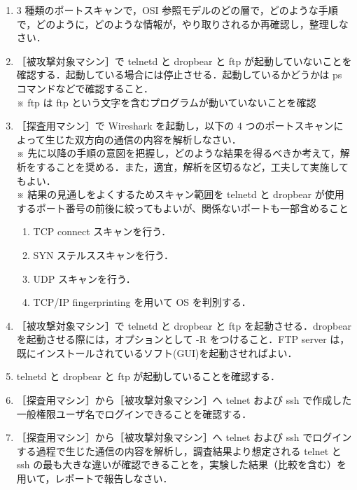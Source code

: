 \documentclass[dvipdfmx,autodetect-engine, 12pt]{jsarticle}
\begin{document}
\begin{enumerate}[label=(\arabic*)]
\begin{enumerate}[label=\arabic*]
        \quad
        telnetとsshはいずれもサーバ間のリモートアクセスに用いられるプロトコルであるが, sshでは通信内容が暗号化される一方でtelnetにおいては暗号化する仕組みがない\cite{telnet_ssh}.
        
        \item 3 種類のポートスキャンで，OSI 参照モデルのどの層で，どのような手順で，どのように，どのような情報が，やり取りされるか再確認し，整理しなさい．
        \item ［被攻撃対象マシン］で telnetd と dropbear と ftp が起動していないことを確認する．起動している場合には停止させる．起動しているかどうかは ps コマンドなどで確認すること． \\
        ※ ftp は ftp という文字を含むプログラムが動いていないことを確認
        \item ［探査用マシン］で Wireshark を起動し，以下の 4 つのポートスキャンによって生じた双方向の通信の内容を解析しなさい． \\
        ※ 先に以降の手順の意図を把握し，どのような結果を得るべきか考えて，解析をすることを奨める．また，適宜，解析を区切るなど，工夫して実施してもよい． \\
        ※ 結果の見通しをよくするためスキャン範囲を telnetd と dropbear が使用するポート番号の前後に絞ってもよいが、関係ないポートも一部含めること
        \begin{enumerate}[label=・]
            \item TCP connect スキャンを行う．
            \item SYN ステルススキャンを行う．
            \item UDP スキャンを行う．
            \item TCP/IP fingerprinting を用いて OS を判別する．
        \end{enumerate}
        \item ［被攻撃対象マシン］で telnetd と dropbear と ftp を起動させる．dropbear を起動させる際には，オプションとして -R をつけること．FTP server は，既にインストールされているソフト(GUI)を起動させればよい．
        \item telnetd と dropbear と ftp が起動していることを確認する．
        \item ［探査用マシン］から［被攻撃対象マシン］へ telnet および ssh で作成した一般権限ユーザ名でログインできることを確認する．
        \item ［探査用マシン］から［被攻撃対象マシン］へ telnet および ssh でログインする過程で生じた通信の内容を解析し，調査結果より想定される telnet と ssh の最も大きな違いが確認できることを，実験した結果（比較を含む）を用いて，レポートで報告しなさい． \\

\end{enumerate}
\end{enumerate}
\end{document}
